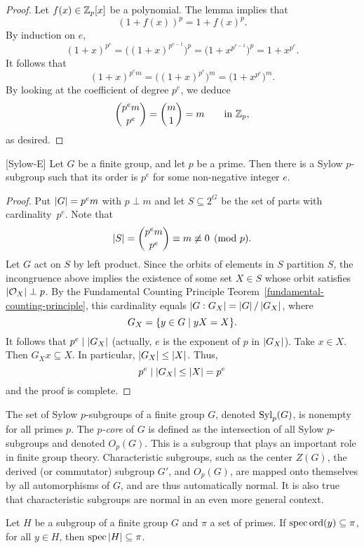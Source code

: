 \begin{proof} Let $f(x)\in\mathbb{Z}_p[x]$ be a polynomial. The lemma implies that
$$
    (1+f(x))^p = 1 + f(x)^p.
$$
By induction on $e$,
$$
    (1+x)^{p^e}=\big((1+x)^{p^{e-1}}\big)^p = (1 + x^{p^{e-1}}\big)^p = 1 + x^{p^e}.
$$
It follows that
$$
    (1+x)^{p^em} = \big((1+x)^{p^e}\big)^m = \big(1 + x^{p^e}\big)^m.
$$
By looking at the coefficient of degree $p^e$, we deduce
$$
    \binom{p^em}{p^e} = \binom m1=m\qquad\textrm{in }\mathbb{Z}_p,
$$
as desired.  \end{proof}

\begin{thm}\label{sylow-e} {\rm[Sylow-E]}
     Let\/ $G$ be a finite group, and let\/ $p$ be a prime. Then there is a Sylow\/ $p$-subgroup such that its order is\/ $p^e$ for some non-negative integer\/ $e$.
\end{thm}

\begin{proof} Put $\left\vert{G}\right\vert=p^em$ with $p\perp m$ and let $S\subseteq 2^G$ be the set of parts with cardinality~$p^e$. Note that
$$
    \left\vert{S}\right\vert=\binom{p^em}{p^e} \equiv m \not\equiv 0\pmod p.
$$
Let $G$ act on $S$ by left product. Since the orbits of elements in $S$ partition $S$, the incongruence above implies the existence of some set $X\in S$ whose orbit satisfies $\left\vert{{\cal O}_X}\right\vert\perp p$. By the Fundamental Counting Principle Teorem~\ref{fundamental-counting-principle}, this cardinality equals $\left\vert{G:G_X}\right\vert=\left\vert{G}\right\vert/\left\vert{G_X}\right\vert$, where
$$
    G_X = \{y\in G\mid yX=X\}.
$$
It follows that $p^e\mid\left\vert{G_X}\right\vert$ (actually, $e$ is the exponent of $p$ in $\left\vert{G_X}\right\vert$). Take $x\in X$. Then $G_Xx\subseteq X$. In particular, $\left\vert{G_X}\right\vert\le\left\vert{X}\right\vert$. Thus,
$$
    p^e\mid\left\vert{G_X}\right\vert \le\left\vert{X}\right\vert= p^e
$$
and the proof is complete.  \end{proof}

\bigskip

The set of Sylow $p$-subgroups of a finite group $G$, denoted ${\rm Syl}_p(G)$, is nonempty for all primes $p$. The \textsl{$p$-core} of $G$ is defined as the intersection of all Sylow $p$-subgroups and denoted $O_p(G)$. This is a subgroup that plays an important role in finite group theory. Characteristic subgroups, such as the center $Z(G)$, the derived (or commutator) subgroup $G'$, and $O_p(G)$, are mapped onto themselves by all automorphisms of $G$, and are thus automatically normal. It is also true that characteristic subgroups are normal in an even more general context.

\begin{cor}\label{elementwise-pi}
    Let $H$ be a subgroup of a finite group $G$ and $\pi$ a set of primes. If\/ $\operatorname{spec}{\rm ord}(y)\subseteq\pi$, for all $y\in H$, then $\operatorname{spec}\left\vert{H}\right\vert\subseteq\pi$.
\end{cor}

